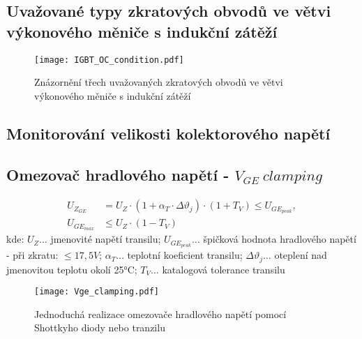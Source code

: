      \subsection{Uvažované typy zkratových obvodů ve větvi vý\-ko\-no\-vého měniče s 
     indukční zátěží}
       \begin{figure}[ht!]
         \centering
         \texttt{[image: IGBT\_OC\_condition.pdf]}
         \caption[Kategorie zkratových obvodů]{Znázornění třech uvažovaných zkratových obvodů ve
                  větvi výkonového měniče s indukční zátěží}\label{VE:fig_OC_condition}
       \end{figure}

     \subsection{Monitorování velikosti kolektorového napětí}\label{PVE:Vce_monitoring}
     \subsection{Omezovač hradlového napětí - $V_{GE}\ clamping$}\label{PVE:Vge_clamping}
     \begin{subequations}\label{PVE:eq_Vzge_tranzil}
     \begin{align}
       U_{Z_{GE}}   &=    U_Z\cdot(1+\alpha_T\cdot\Delta\vartheta_j)\cdot(1+T_V)\leq
                          U_{GE_{peak}},                                                      \\
       U_{GE_{max}} &\leq U_Z\cdot(1-T_V)
     \end{align}
     \end{subequations}
     kde: $U_Z\ldots$ jmenovité napětí transilu; $U_{GE_{peak}}\ldots$ špičková hodnota hradlového 
     napě\-tí - při zkratu: $\leq17,5V$; $\alpha_T\ldots$ teplotní koeficient transilu; 
     $\Delta\vartheta_j\ldots$ oteplení nad jmenovitou teplotu okolí 25°C; $T_V\ldots$ katalogová 
     tolerance transilu

       \begin{figure}[ht!]
         \centering
         \texttt{[image: Vge\_clamping.pdf]}
         \caption[Omezovač hradlového napětí]{Jednoduchá realizace omezovače hradlového napětí pomocí Shottkyho diody nebo tranzilu}\label{VE:fig_Vge_clamp}
       \end{figure}

